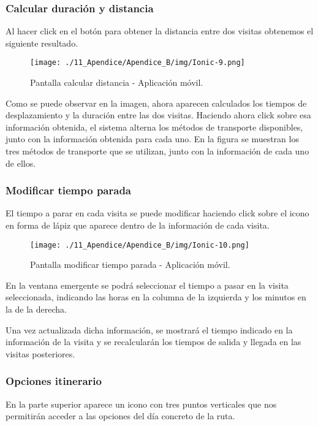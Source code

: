 \subsubsection*{Calcular duración y distancia}

Al hacer click en el botón para obtener la distancia entre dos visitas obtenemos el siguiente resultado.

\begin{figure}[H]
\centering
\texttt{[image: ./11\_Apendice/Apendice\_B/img/Ionic-9.png]}
\caption{Pantalla calcular distancia - Aplicación móvil.}
\end{figure}

Como se puede observar en la imagen, ahora aparecen calculados los tiempos de desplazamiento y la duración entre las dos visitas. Haciendo ahora click sobre esa información obtenida, el sistema alterna los métodos de transporte disponibles, junto con la información obtenida para cada uno. En la figura se muestran los tres métodos de transporte que se utilizan, junto con la información de cada uno de ellos.


\subsubsection*{Modificar tiempo parada}
El tiempo a parar en cada visita se puede modificar haciendo click sobre el icono en forma de lápiz que aparece dentro de la información de cada visita.

\begin{figure}[H]
\centering
\texttt{[image: ./11\_Apendice/Apendice\_B/img/Ionic-10.png]}
\caption{Pantalla modificar tiempo parada - Aplicación móvil.}
\end{figure}

En la ventana emergente se podrá seleccionar el tiempo a pasar en la visita seleccionada, indicando las horas  en la columna de la izquierda y los minutos en la de la derecha. 

Una vez actualizada dicha información, se mostrará el tiempo indicado en la información de la visita y se recalcularán los tiempos de salida y llegada en las visitas posteriores.


\subsubsection*{Opciones itinerario}
En la parte superior aparece un icono con tres puntos verticales que nos permitirán acceder a las opciones del día concreto de la ruta.

